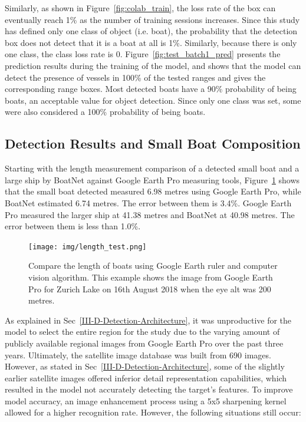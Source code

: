 Similarly, as shown in Figure~\ref{fig:colab_train}, the loss rate of the box can eventually reach 1\% as the number of training sessions increases. Since this study has defined only one class of object (i.e. boat), the probability that the detection box does not detect that it is a boat at all is 1\%. Similarly, because there is only one class, the class loss rate is 0. Figure~\ref{fig:test_batch1_pred} presents the prediction results during the training of the model, and shows that the model can detect the presence of vessels in 100\% of the tested ranges and gives the corresponding range boxes. Most detected boats have a 90\% probability of being boats, an acceptable value for object detection. Since only one class was set, some were also considered a 100\% probability of being boats.

\subsection{Detection Results and Small Boat Composition}
Starting with the length measurement comparison of a detected small boat and a large ship by BoatNet against Google Earth Pro measuring tools, Figure~\ref{fig:length_test} shows that the small boat detected measured 6.98 metres using Google Earth Pro, while BoatNet estimated 6.74 metres. The error between them is 3.4\%. Google Earth Pro measured the larger ship at 41.38 metres and BoatNet at 40.98 metres. The error between them is less than 1.0\%.

\begin{figure}[t]
    \center
    \texttt{[image: img/length\_test.png]}
    \caption{Compare the length of boats using Google Earth ruler and computer vision algorithm. This example shows the image from Google Earth Pro for Zurich Lake on 16th August 2018 when the eye alt was 200 metres.}
    \label{fig:length_test}
\end{figure}

As explained in Sec~\ref{III-D-Detection-Architecture}, it was unproductive for the model to select the entire region for the study due to the varying amount of publicly available regional images from Google Earth Pro over the past three years. Ultimately, the satellite image database was built from 690 images. However, as stated in Sec~\ref{III-D-Detection-Architecture}, some of the slightly earlier satellite images offered inferior detail representation capabilities, which resulted in the model not accurately detecting the target's features. To improve model accuracy, an image enhancement process using a 5x5 sharpening kernel allowed for a higher recognition rate. However, the following situations still occur:

